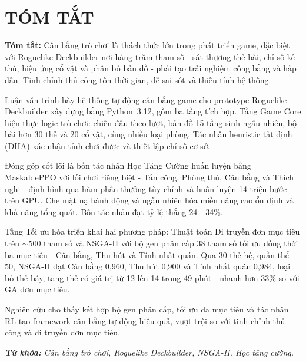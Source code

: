 ﻿\clearpage
{}
{}
\chapter*{TÓM TẮT}

\vspace{0.5cm}

\noindent\textbf{Tóm tắt:} Cân bằng trò chơi là thách thức lớn trong phát triển game, đặc biệt với Roguelike Deckbuilder nơi hàng trăm tham số - sát thương thẻ bài, chỉ số kẻ thù, hiệu ứng cổ vật và phân bố bản đồ - phải tạo trải nghiệm công bằng và hấp dẫn. Tinh chỉnh thủ công tốn thời gian, dễ sai sót và thiếu tính hệ thống.

Luận văn trình bày hệ thống tự động cân bằng game cho prototype Roguelike Deckbuilder xây dựng bằng Python~3.12, gồm ba tầng tích hợp. Tầng Game Core hiện thực logic trò chơi: chiến đấu theo lượt, bản đồ 15 tầng sinh ngẫu nhiên, bộ bài hơn 30 thẻ và 20 cổ vật, cùng nhiều loại phòng. Tác nhân heuristic tất định (DHA) xác nhận tính chơi được và thiết lập chỉ số cơ sở.

Đóng góp cốt lõi là bốn tác nhân Học Tăng Cường huấn luyện bằng MaskablePPO với lối chơi riêng biệt - Tấn công, Phòng thủ, Cân bằng và Thích nghi - định hình qua hàm phần thưởng tùy chỉnh và huấn luyện 14 triệu bước trên GPU. Che mặt nạ hành động và ngẫu nhiên hóa miền nâng cao ổn định và khả năng tổng quát. Bốn tác nhân đạt tỷ lệ thắng 24 - 34\%.

Tầng Tối ưu hóa triển khai hai phương pháp: Thuật toán Di truyền đơn mục tiêu trên $\sim$500 tham số và NSGA-II với bộ gen phân cấp 38 tham số tối ưu đồng thời ba mục tiêu - Cân bằng, Thu hút và Tính nhất quán. Qua 30 thế hệ, quần thể 50, NSGA-II đạt Cân bằng 0,960, Thu hút 0,900 và Tính nhất quán 0,984, loại bỏ thẻ bẫy, tăng thẻ có giá trị từ 12 lên 14 trong 49 phút - nhanh hơn 33\% so với GA đơn mục tiêu.

Nghiên cứu cho thấy kết hợp bộ gen phân cấp, tối ưu đa mục tiêu và tác nhân RL tạo framework cân bằng tự động hiệu quả, vượt trội so với tinh chỉnh thủ công và di truyền đơn mục tiêu.

\vspace{0.5cm}
\noindent\textit{\textbf{Từ khóa:}} \textit{Cân bằng trò chơi, Roguelike Deckbuilder, NSGA-II, Học tăng cường.}
